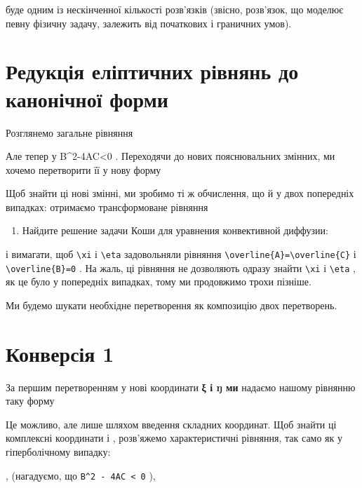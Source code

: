 \documentclass[
  ukrainian,
]{article}
\providecommand{\tightlist}{%
  \setlength{\itemsep}{0pt}\setlength{\parskip}{0pt}}
\begin{document}
буде одним із нескінченної кількості розв'язків (звісно, розв'язок, що
моделює певну фізичну задачу, залежить від початкових і граничних умов).

\section{Редукція еліптичних рівнянь до канонічної
форми}\label{ux440ux435ux434ux443ux43aux446ux456ux44f-ux435ux43bux456ux43fux442ux438ux447ux43dux438ux445-ux440ux456ux432ux43dux44fux43dux44c-ux434ux43e-ux43aux430ux43dux43eux43dux456ux447ux43dux43eux457-ux444ux43eux440ux43cux438}

Розглянемо загальне рівняння

Але тепер у B\^{}2-4AC\textless0 . Переходячи до нових пояснювальних
змінних, ми хочемо перетворити її у нову форму

Щоб знайти ці нові змінні, ми зробимо ті ж обчислення, що й у двох
попередніх випадках: отримаємо трансформоване рівняння

\begin{enumerate}
\def\labelenumi{\arabic{enumi}.}
\setcounter{enumi}{1}
\tightlist
\item
  Найдите решение задачи Коши для уравнения конвективной диффузии:
\end{enumerate}

і вимагати, щоб \texttt{\textbackslash{}xi} і
\texttt{\textbackslash{}eta} задовольняли рівняння
\texttt{\textbackslash{}overline\{A\}=\textbackslash{}overline\{C\}} і
\texttt{\textbackslash{}overline\{B\}=0} . На жаль, ці рівняння не
дозволяють одразу знайти \texttt{\textbackslash{}xi} і
\texttt{\textbackslash{}eta} , як це було у попередніх випадках, тому ми
продовжимо трохи пізніше.

Ми будемо шукати необхідне перетворення як композицію двох перетворень.

\section{Конверсія
1}\label{ux43aux43eux43dux432ux435ux440ux441ux456ux44f-1}

За першим перетворенням у нові координати \textbf{ξ і ŋ ми} надаємо
нашому рівнянню таку форму

Це можливо, але лише шляхом введення складних координат. Щоб знайти ці
комплексні координати \xi  і \eta  , розв'яжемо характеристичні
рівняння, так само як у гіперболічному випадку:

, (нагадуємо, що \texttt{B\^{}2\ -\ 4AC\ \textless{}\ 0} ),
\end{document}
